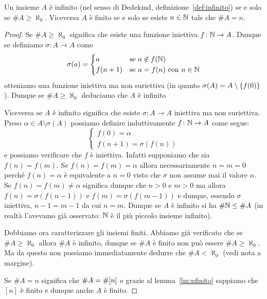 \begin{theorem}
Un insieme $A$ è infinito (nel senso di Dedekind, definizione~\ref{def:infinito})
se e solo se $\# A \ge \aleph_0$.
Viceversa $A$ è finito se e solo se esiste $n\in{\mathbb N}$ tale che $\# A = n$.
\end{theorem}
%
\begin{proof}
Se $\#A \ge \aleph_0$ significa che esiste una funzione 
iniettiva $f\colon {\mathbb N}\to A$. 
Dunque se definiamo $\sigma \colon A \to A$ come
\[
\sigma(a) = \begin{cases}
  a & \text{se $a\not\in f({\mathbb N})$}\\
  f(n+1) & \text{se $a=f(n)$ con $n\in{\mathbb N}$}
\end{cases}
\]
otteniamo una funzione iniettiva ma non suriettiva 
(in quanto $\sigma(A) = A\setminus{\left\{ f(0) \right\}}$).
Dunque se $\#A\ge \aleph_0$ deduciamo che $A$ è infinito

Viceversa se $A$ è infinito significa che esiste $\sigma\colon A \to A$ 
iniettiva ma non suriettiva. 
Preso $\alpha \in A \setminus\sigma(A)$
possiamo definire induttivamente $f\colon {\mathbb N}\to A$ come segue:
\[
\begin{cases}
  f(0) = \alpha\\
  f(n+1) = \sigma(f(n))
\end{cases}
\]
e possiamo verificare che $f$ è iniettiva. 
Infatti supponiamo che sia $f(n)=f(m)$.
Se $f(n)=f(m)=\alpha$ allora necessariamente $n=m=0$ 
perché $f(n)=\alpha$ è equivalente a $n=0$ visto che $\sigma$
non assume mai il valore $\alpha$.
Se $f(n)=f(m)\neq \alpha$ significa dunque che $n>0$ e $m>0$
ma allora $f(n)=\sigma(f(n-1))$ e $f(m)=\sigma(f(m-1))$
e dunque, essendo $\sigma$ iniettiva, $n-1=m-1$ da cui $n=m$. 
Dunque se $A$ è infinito si ha $\#{\mathbb N}\le \#A$
(in realtà l'avevamo già osservato: ${\mathbb N}$ è il più piccolo insieme infinito).

Dobbiamo ora caratterizzare gli insiemi finiti.
Abbiamo già verificato che se $\#A \ge \aleph_0$ 
allora $\#A$ è infinito, dunque se $\#A$ è finito 
non può essere $\#A \ge \aleph_0$.
Ma da questo non possiamo immediatamente 
dedurre che $\#A < \aleph_0$ (vedi nota a margine).%
%

Se $\#A = n$ significa che $\#A = \#{\left[ n \right]}$ e 
grazie al lemma~\ref{lm:nfinito} sappiamo che $[n]$ è finito 
e dunque anche $A$ è finito.


\end{proof}
